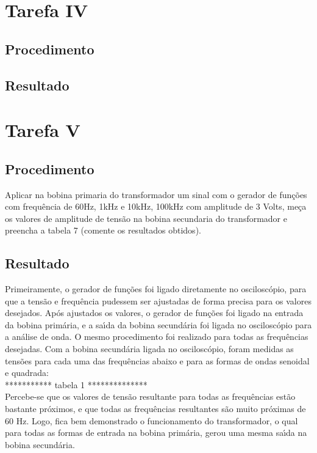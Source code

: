 \section{Tarefa IV}
\subsection{Procedimento}
\subsection{Resultado}

\section{Tarefa V}
\subsection{Procedimento}
Aplicar na bobina primaria do transformador um sinal com o gerador de fun\c{c}\~{o}es com frequ\^{e}ncia de 60Hz, 1kHz e 10kHz, 100kHz com amplitude de 3 Volts, me\c{c}a os valores de amplitude de tens\~{a}o na bobina secundaria do transformador e preencha a tabela 7 (comente os resultados obtidos).
\subsection{Resultado}
Primeiramente, o gerador de fun\c{c}\~{o}es foi ligado diretamente no oscilosc\'{o}pio, para que a tens\~{a}o e frequ\^{e}ncia pudessem ser ajustadas de forma precisa para os valores desejados. Ap\'{o}s ajustados os valores, o gerador de fun\c{c}\~{o}es foi ligado na entrada da bobina prim\'{a}ria, e a sa\'{\i}da da bobina secund\'{a}ria foi ligada no oscilosc\'{o}pio para a an\'{a}lise de onda. O mesmo procedimento foi realizado para todas as frequ\^{e}ncias desejadas. Com a bobina secund\'{a}ria ligada no oscilosc\'{o}pio, foram medidas as tens\~{o}es para cada uma das frequ\^{e}ncias abaixo e para as formas de ondas senoidal e quadrada: \\

*********** tabela 1 ************** \\

Percebe-se que os valores de tens\~{a}o resultante para todas as frequ\^{e}ncias est\~{a}o bastante pr\'{o}ximos, e que todas as frequ\^{e}ncias resultantes s\~{a}o muito pr\'{o}ximas de 60 Hz. Logo, fica bem demonstrado o funcionamento do transformador, o qual para todas as formas de entrada na bobina prim\'{a}ria, gerou uma mesma sa\'{\i}da na bobina secund\'{a}ria. 